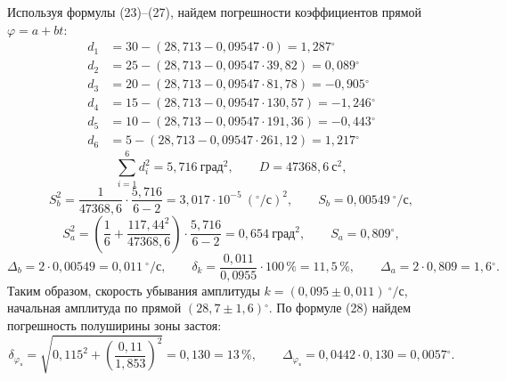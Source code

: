 \documentclass[11pt,a4paper]{article}
\newcommand{\gr}{\ensuremath{^\circ}}
\newcommand{\sub}[1]{\text{#1}}
\begin{document}
Используя формулы (23)–(27), найдем погрешности коэффициентов прямой $\varphi=a+bt$:
\begin{align*}
d_1&=30-(28,713-0,09547\cdot0)=1,287\gr\\
d_2&=25-(28,713-0,09547\cdot39,82)=0,089\gr\\
d_3&=20-(28,713-0,09547\cdot81,78)=-0,905\gr\\
d_4&=15-(28,713-0,09547\cdot130,57)=-1,246\gr\\
d_5&=10-(28,713-0,09547\cdot191,36)=-0,443\gr\\
d_6&=5-(28,713-0,09547\cdot261,12)=1,217\gr
\end{align*}
\[
\sum_{i=1}^{6}d_i^2=5,716\ \text{град}^2,\qquad D=47368,6\ \text{с}^2,
\]
\[
S_b^2=\frac{1}{47368,6}\cdot\frac{5,716}{6-2}=3,017\cdot10^{-5}\ \left(^\circ/\text{с}\right)^2,\qquad S_b=0,00549\ {}^\circ/\text{с},
\]
\[
S_a^2=\left(\frac{1}{6}+\frac{117,44^2}{47368,6}\right)\cdot\frac{5,716}{6-2}=0,654\ \text{град}^2,\qquad S_a=0,809\gr,
\]
\[
\Delta_b=2\cdot0,00549=0,011\ {}^\circ/\text{с},\qquad \delta_k=\frac{0,011}{0,0955}\cdot100\,\%=11,5\,\%,\qquad \Delta_a=2\cdot0,809=1,6\gr.
\]
Таким образом, скорость убывания амплитуды $k=(0,095\pm0,011)\ {}^\circ/\text{с}$, начальная амплитуда по прямой $(28,7\pm1,6)\gr$.
По формуле (28) найдем погрешность полуширины зоны застоя:
\[
\delta_{\varphi_\sub{з}}=\sqrt{0,115^2+\left(\frac{0,11}{1,853}\right)^2}=0,130=13\,\%,\qquad
\Delta_{\varphi_\sub{з}}=0,0442\cdot0,130=0,0057\gr.
\]
\end{document}
